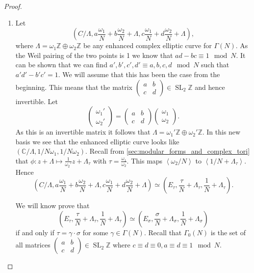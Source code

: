 \documentclass[a4paper]{article}
\theoremstyle{theoremdd}
\theoremstyle{definitiondd}
\theoremstyle{remarkdd}
\newcommand{\Z}{\mathbb{Z}}
\newcommand{\C}{\mathbb{C}}
\DeclareMathOperator{\SL}{SL}
\begin{document}
\begin{proof}
\begin{enumerate}
	\item Let 
		\[\left( C / \Lambda, a \frac{\omega_1}{N} + b \frac{\omega_2}{N} + \Lambda,  c \frac{\omega_1}{N}  + d \frac{\omega_2}{N}  + \Lambda \right) ,\]
	where $\Lambda = \omega_1 \Z \oplus \omega_2 \Z$ be any enhanced complex elliptic curve for $\Gamma(N)$.
	As the Weil pairing of the two points is 1 we know that $ad - bc \equiv 1 \mod N $. 
	It can be shown that we can find $a', b', c', d' \equiv a, b, c, d \mod N$ such that  $a'd' - b'c' = 1$. 
	We will assume that this has been the case from the beginning. 
	This means that the matrix  $\begin{pmatrix} a & b \\ c& d \end{pmatrix}  \in \SL_2\Z$ and hence invertible. 
	Let \[
		\begin{pmatrix} \omega_1' \\ \omega_2' \end{pmatrix}  = 
		\begin{pmatrix} a & b \\ c & d \end{pmatrix} 
		\begin{pmatrix} \omega_1 \\ \omega_2 \end{pmatrix} 
	.\] 
	As this is an invertible matrix it follows that $\Lambda = \omega_1' \Z \oplus \omega_2' \Z$. 
	In this new basis we see that the enhanced elliptic curve looks like $(\C / \Lambda, 1 / N \omega_1,  1 / N \omega_2)$.
	Recall from \cref{sec:modular_forms_and_complex_tori} that  $\phi: z  + \Lambda \mapsto  \frac{1}{\omega_2'} z + \Lambda_\tau$ with $\tau = \frac{\omega_1}{\omega_2}$. 
	This maps  $\left<\omega_2 / N \right>$ to $\left<1 / N + \Lambda_\tau \right>$.
	Hence  \[
		\left( C / \Lambda, a \frac{\omega_1}{N} + b \frac{\omega_2}{N} + \Lambda,  c \frac{\omega_1}{N}  + d \frac{\omega_2}{N}  + \Lambda \right)
		\simeq
		\left( E_\tau, \frac{\tau}{N} + \Lambda_\tau, \frac{1}{N} + \Lambda_\tau \right)
	.\] 

	We will know prove that \[
		\left( E_\tau , \frac{\tau}{N} + \Lambda_\tau, \frac{1}{N} + \Lambda_\tau \right) \simeq 
		\left( E_\sigma, \frac{\sigma}{N} + \Lambda_ \sigma, \frac{1}{N} + \Lambda_\sigma \right) 
	\]
	if and only if $\tau = \gamma \cdot \sigma$ for some $\gamma \in \Gamma(N)$.
	Recall that $\Gamma_0(N)$ is the set of all matrices $\begin{pmatrix} a & b \\ c & d \end{pmatrix} \in \SL_2\Z$ where $c \equiv d \equiv 0, a \equiv d \equiv 1 \mod N$. 


\end{enumerate}
\end{proof}
\end{document}
